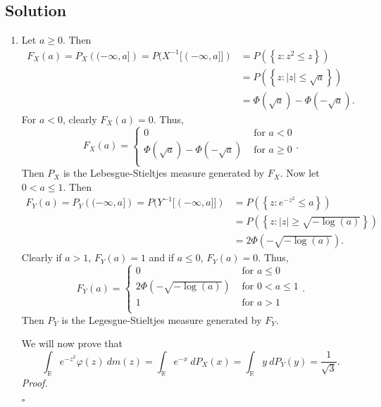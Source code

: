 \documentclass[12pt]{article}
\newcounter{ProofCounter}
\newenvironment{Proof}{\stepcounter{ProofCounter}\textit{Proof.}}{\hfill$\square$}
\begin{document}
\subsection*{Solution}
\begin{enumerate}[label=(\alph*)]
\item 
Let $a \geq 0$. Then 
\begin{align*}
F_{X}(a) = P_{X}\left( (-\infty, a] \right) = P(X^{-1}[(-\infty, a]]) & = P\left( \left\{ z : z^{2} \leq z \right\} \right) \\
& = P\left( \left\{ z : |z| \leq \sqrt{a} \right\} \right) \\
& = \Phi(\sqrt{a}) - \Phi(-\sqrt{a}). 
\end{align*}
For $a < 0$, clearly $F_{X}(a) = 0$. Thus,
\[ F_{X}(a) = \left\{ \begin{array}{cl}
0 & \text{ for } a < 0 \\
\Phi(\sqrt{a}) - \Phi(-\sqrt{a}) & \text{ for } a \geq 0 \\
\end{array} \right.. \]
Then $P_{X}$ is the Lebesgue-Stieltjes measure generated by $F_{X}$. Now let $0 < a \leq 1$. Then 
\begin{align*}
F_{Y}(a) = P_{Y}\left( (-\infty, a] \right) = P(Y^{-1}[(-\infty, a]]) & = P\left( \left\{ z : e^{-z^{2}} \leq a \right\} \right) \\
& = P\left( \left\{ z : |z| \geq \sqrt{-\log(a)} \right\} \right) \\
& = 2\Phi(-\sqrt{-\log(a)}).
\end{align*}
Clearly if $a > 1$, $F_{Y}(a) = 1$ and if $a \leq 0$, $F_{Y}(a) = 0$. Thus,
\[ F_{Y}(a) = \left\{ \begin{array}{cl}
0 & \text{ for } a \leq 0 \\
2\Phi(-\sqrt{-\log(a)}) & \text{ for } 0 < a \leq 1 \\
1 & \text{ for } a > 1 \\
\end{array} \right. . \]
Then $P_{Y}$ is the Legesgue-Stieltjes measure generated by $F_{Y}$.

We will now prove that 
\[ \int_{\mathbb{R}}e^{-z^{2}}\varphi(z)\ dm(z) = \int_{\mathbb{R}}e^{-x}\ dP_{X}(x) = \int_{\mathbb{R}}y\ dP_{Y}(y) = \frac{1}{\sqrt{3}}. \]
\begin{Proof} 


\end{Proof}
\end{enumerate}
\end{document}
